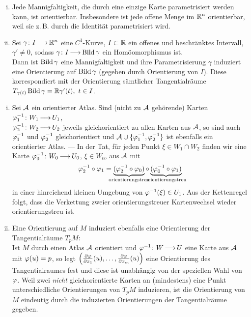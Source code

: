 \documentclass[skript.tex]{subfiles}
\begin{document}
	\begin{bsp}\hfill\vspace{-.5\baselineskip}
		\begin{enumerate}[(i)]
			\item Jede Mannigfaltigkeit, die durch eine einzige Karte parametrisiert werden kann, ist orientierbar. Insbesondere ist jede offene Menge im ${\mathbb{R}^n}$ orientierbar, weil sie z.\,B. durch die Identität parametrisiert wird.
			\item Sei $\gamma \colon I \kern -1pt \longrightarrow \kern -1pt {\mathbb{R}^n}$ eine $C^1$-Kurve, $I\subset\mathbb{R}$ ein offenes und beschränktes Intervall, $\gamma' \neq 0$, sodass $\gamma \colon I \kern -1pt \longrightarrow \kern -1pt \operatorname{Bild}\gamma$ ein Homöomorphismus ist.\\ Dann ist $\operatorname{Bild}\gamma$ eine Mannigfaltigkeit und ihre Parametrisierung $\gamma$ induziert eine Orientierung auf $\operatorname{Bild}\gamma$ (gegeben durch Orientierung von $I$). Diese korrespondiert mit der Orientierung sämtlicher Tangentialräume
			$T_{\gamma(t)}\operatorname{Bild}\gamma = \mathbb{R}\gamma'(t),\ t \in I$.
		\end{enumerate}
	\end{bsp}

	\begin{bem}\hfill\vspace{-.5\baselineskip}
		\begin{enumerate}[(i)]
			\item Sei $\mathcal{A}$ ein orientierter Atlas. Sind (nicht zu $\mathcal{A}$ gehörende) Karten $\varphi_1^{-1} \colon W_1 \kern -1pt \longrightarrow \kern -1pt U_1$,\\ $\varphi_2^{-1} \colon W_2 \kern -1pt \longrightarrow \kern -1pt U_2$ jeweils gleichorientiert zu allen Karten aus $\mathcal{A}$, so sind auch $\varphi_1^{-1}$ und $\varphi_2^{-1}$ gleichorientiert und $\mathcal{A} \cup \{\varphi_1^{-1},\varphi_2^{-1}\}$ ist ebenfalls ein orientierter Atlas. --- In der Tat, für jeden Punkt $\xi \in W_1 \cap W_2$ finden wir eine Karte $\varphi_0^{-1} \colon W_0 \kern -1pt \longrightarrow \kern -1pt U_0$, $\xi \in W_0$, aus $\mathcal{A}$ mit
			\[
				\vphi_2^{-1}\circ\vphi_1 = \underbrace{(\vphi_2^{-1}\circ\vphi_0)}_{\mathclap{\text{orientierungstreu}}}\circ\underbrace{(\vphi_0^{-1}\circ\vphi_1)}_{\mathclap{\text{orientierungstreu}}}
			\]
			in einer hinreichend kleinen Umgebung von $\varphi^{-1}(\xi) \in U_1$. Aus der Kettenregel folgt, dass die Verkettung zweier orientierungstreuer Kartenwechsel wieder orientierungstreu ist.
			
			\item Eine Orientierung auf $M$ induziert ebenfalls eine Orientierung der Tangentialräume $T_p M$:\\
			Ist $M$ durch einen Atlas $\mathcal{A}$ orientiert und $\varphi^{-1}\colon W \kern -1pt \longrightarrow \kern -1pt U$ eine Karte aus $\mathcal{A}$ mit $\varphi(u) = p$, so legt $\left(\frac{\partial \varphi}{\partial x_1}(u),\dotsc,\frac{\partial \varphi}{\partial x_m}(u)\right)$ eine Orientierung des Tangentialraumes fest und diese ist unabhängig von der speziellen Wahl von $\varphi$. Weil zwei \emph{nicht} gleichorientierte Karten an (mindestens) eine Punkt unterschiedliche Orientierungen von $T_p M$ induzieren, ist die Orientierung von $M$ eindeutig durch die induzierten Orientierungen der Tangentialräume gegeben.
		\end{enumerate}
	\end{bem}
\end{document}
